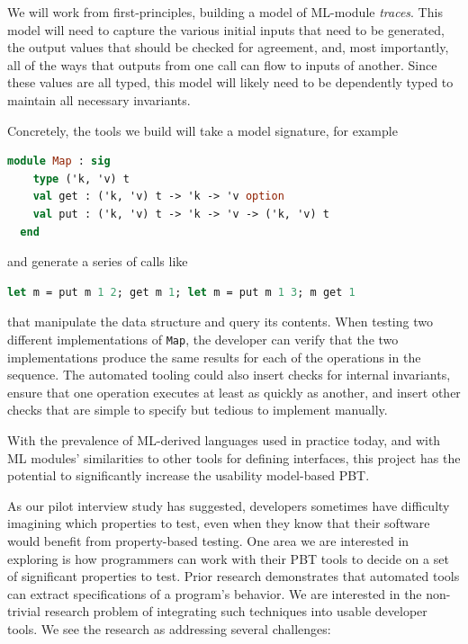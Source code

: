 We will work from first-principles, building a model of ML-module {\em traces}.
This model will need to capture the various initial inputs that need to be
generated, the output values that should be checked for agreement, and, most
importantly, all of the ways that outputs from one call can flow to inputs of
another. Since these values are all typed, this model will likely need to be
dependently typed to maintain all necessary invariants.

Concretely, the tools we build will take a model signature, for example
\begin{lstlisting}[language=Caml]
  module Map : sig
    type ('k, 'v) t
    val get : ('k, 'v) t -> 'k -> 'v option
    val put : ('k, 'v) t -> 'k -> 'v -> ('k, 'v) t
  end
\end{lstlisting}
and generate a series of calls like
\begin{lstlisting}[language=Caml]
  let m = put m 1 2; get m 1; let m = put m 1 3; m get 1
\end{lstlisting}
that manipulate the data structure and query its contents. When testing two
different implementations of \lstinline{Map}, the developer can verify that the
two implementations produce the same results for each of the operations in the
sequence. The automated tooling could also insert checks for internal
invariants, ensure that one operation executes at least as quickly as another,
and insert other checks that are simple to specify but tedious to implement
manually.

With the prevalence of ML-derived languages used in practice today, and with ML
modules' similarities to other tools for defining interfaces, this project has
the potential to significantly increase the usability model-based PBT.


 

As our pilot interview study has suggested, developers sometimes have
difficulty imagining which properties to test, even when they know that their
software would benefit from property-based testing. One area we are interested
in exploring is how programmers can work with their PBT tools to decide on a set
of significant properties to test.  Prior research demonstrates that automated
tools can extract specifications of a program's
behavior\cite{ammons2002mining,le2018deep,claessen2010quickspec}. We are
interested in the non-trivial research problem of integrating such techniques
into usable developer tools. We see the research as addressing several
challenges:

